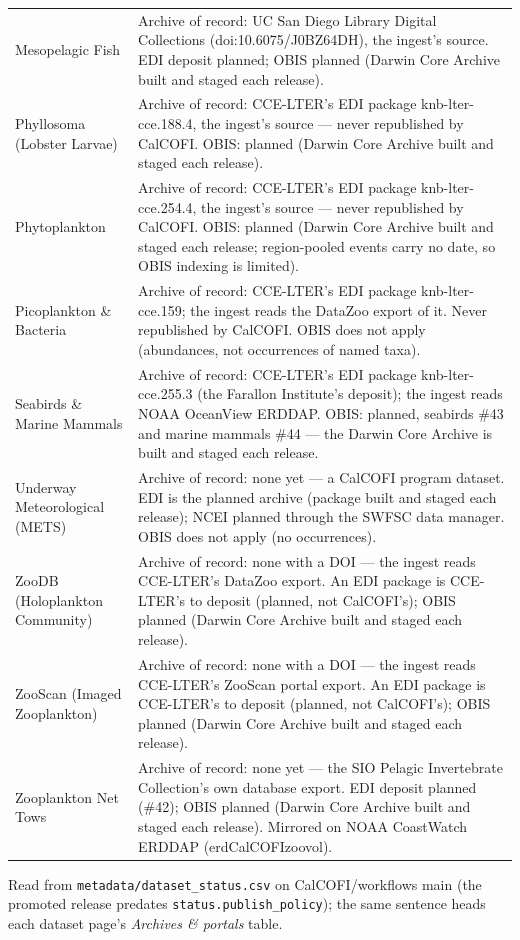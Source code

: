 \documentclass[
  letterpaper,
  DIV=11,
  numbers=noendperiod]{scrreprt}
\begin{document}
\begin{table}
{\begin{tabular*}{1\linewidth}{@{\extracolsep{\fill}}ll}
Mesopelagic Fish & Archive of record: UC San Diego Library Digital Collections (doi:10.6075/J0BZ64DH), the ingest's source. EDI deposit planned; OBIS planned (Darwin Core Archive built and staged each release). \\ 
Phyllosoma (Lobster Larvae) & Archive of record: CCE-LTER's EDI package knb-lter-cce.188.4, the ingest's source — never republished by CalCOFI. OBIS: planned (Darwin Core Archive built and staged each release). \\ 
Phytoplankton & Archive of record: CCE-LTER's EDI package knb-lter-cce.254.4, the ingest's source — never republished by CalCOFI. OBIS: planned (Darwin Core Archive built and staged each release; region-pooled events carry no date, so OBIS indexing is limited). \\ 
Picoplankton \& Bacteria & Archive of record: CCE-LTER's EDI package knb-lter-cce.159; the ingest reads the DataZoo export of it. Never republished by CalCOFI. OBIS does not apply (abundances, not occurrences of named taxa). \\ 
Seabirds \& Marine Mammals & Archive of record: CCE-LTER's EDI package knb-lter-cce.255.3 (the Farallon Institute's deposit); the ingest reads NOAA OceanView ERDDAP. OBIS: planned, seabirds \#43 and marine mammals \#44 — the Darwin Core Archive is built and staged each release. \\ 
Underway Meteorological (METS) & Archive of record: none yet — a CalCOFI program dataset. EDI is the planned archive (package built and staged each release); NCEI planned through the SWFSC data manager. OBIS does not apply (no occurrences). \\ 
ZooDB (Holoplankton Community) & Archive of record: none with a DOI — the ingest reads CCE-LTER's DataZoo export. An EDI package is CCE-LTER's to deposit (planned, not CalCOFI's); OBIS planned (Darwin Core Archive built and staged each release). \\ 
ZooScan (Imaged Zooplankton) & Archive of record: none with a DOI — the ingest reads CCE-LTER's ZooScan portal export. An EDI package is CCE-LTER's to deposit (planned, not CalCOFI's); OBIS planned (Darwin Core Archive built and staged each release). \\ 
Zooplankton Net Tows & Archive of record: none yet — the SIO Pelagic Invertebrate Collection's own database export. EDI deposit planned (\#42); OBIS planned (Darwin Core Archive built and staged each release). Mirrored on NOAA CoastWatch ERDDAP (erdCalCOFIzoovol). \\ 
\bottomrule
\end{tabular*}
\begin{minipage}{\linewidth}
\vspace{.05em}
Read from \texttt{metadata/dataset\_status.csv} on CalCOFI/workflows main (the promoted release predates \texttt{status.publish\_policy}); the same sentence heads each dataset page's \emph{Archives \& portals} table.\\
\end{minipage}

}

\end{table}%
\end{document}
